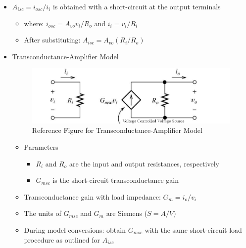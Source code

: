 \begin{itemize}
  \item $A_{isc}=i_{osc}/i_i$ is obtained with a short-circuit at the output terminals

    \begin{itemize}

      \item where: $i_{osc}=A_{vo}v_i/R_o$ and $i_i=v_i/R_i$

      \item After substituting: $A_{isc}=A_{vo}(R_i/R_o)$

    \end{itemize}

  \item Transconductance-Amplifier Model

    \begin{figure}[H]
      \centering
      \includegraphics[width=.7\textwidth]{Images/TransConAmp.png}
      \caption{Reference Figure for Transconductance-Amplifier Model}
      \label{fig:3}
    \end{figure}

    \begin{itemize}

      \item Parameters

        \begin{itemize}

          \item $R_i$ and $R_o$ are the input and output resistances, respectively

          \item $G_{msc}$ is the short-circuit transconductance gain

        \end{itemize}

      \item Transconductance gain with load impedance: $G_m=i_o/v_i$

      \item The units of $G_{msc}$ and $G_m$ are Siemens ($S=A/V$)

      \item During model conversions: obtain $G_{msc}$ with the same short-circuit load procedure as outlined for $A_{isc}$


\end{itemize}
\end{itemize}
